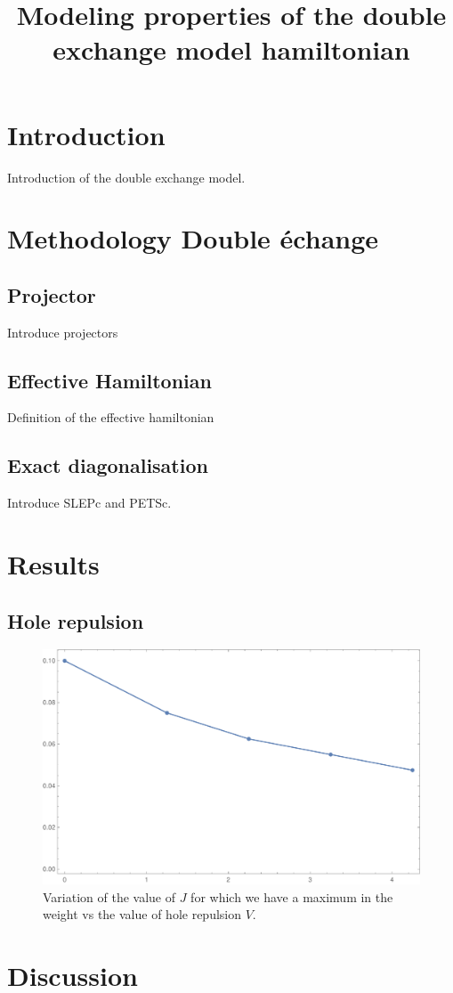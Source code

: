 \documentclass[ openright,titlepage,numbers=noenddot,headinclude,twoside,%
                footinclude=true,cleardoublepage=empty,abstractoff,%
                BCOR=5mm,paper=a4,fontsize=11pt,%
                ngerman,american,%
]{scrreprt}
\title{Modeling properties of the double exchange model hamiltonian}
\begin{document}
\maketitle
\thispagestyle{fancy}
\section{Introduction}

Introduction of the double exchange model.

\section{Methodology Double échange}

\subsection{Projector}

Introduce projectors

\subsection{Effective Hamiltonian}

Definition of the effective hamiltonian

\subsection{Exact diagonalisation}

Introduce SLEPc and PETSc.

\section{Results}

\subsection{Hole repulsion}

\begin{figure}[ht]
    \centering
    \includegraphics[scale=0.5]{12_4h_J_wmax_vs_xrep.pdf}
    \caption{\label{fig:}Variation of the value of $J$ for which we have a maximum in the weight vs the value of hole repulsion $V$. }
\end{figure}

\section{Discussion}
\end{document}
